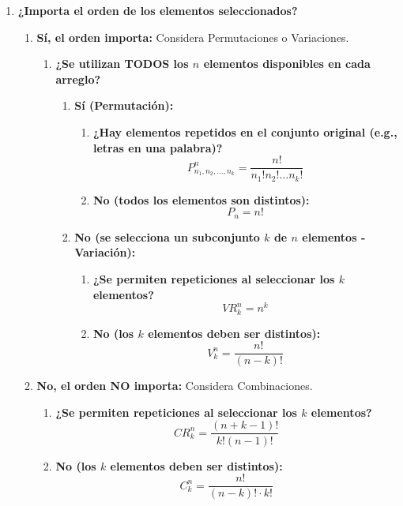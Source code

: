 \documentclass[12pt, letterpaper]{article}
\begin{document}
\begin{enumerate}[label=\bfseries Paso \arabic*:, wide, labelwidth=!, leftmargin=0pt]
    \item \textbf{¿Importa el orden de los elementos seleccionados?}
    \begin{enumerate}[label=\alph*)]
        \item \textbf{Sí, el orden importa:} Considera Permutaciones o Variaciones.
        \begin{enumerate}[label=\roman*)]
            \item \textbf{¿Se utilizan TODOS los $n$ elementos disponibles en cada arreglo?}
            \begin{enumerate}[label=\alph*)]
                \item \textbf{Sí (Permutación):}
                \begin{enumerate}[label=\roman*)]
                    \item \textbf{¿Hay elementos repetidos en el conjunto original (e.g., letras en una palabra)?}
                        \[ P_{n_1, n_2, \dots, n_k}^n = \frac{n!}{n_1! n_2! \dots n_k!} \]
                    \item \textbf{No (todos los elementos son distintos):}
                        \[ P_n = n! \]
                \end{enumerate}
                \item \textbf{No (se selecciona un subconjunto $k$ de $n$ elementos - Variación):}
                \begin{enumerate}[label=\roman*)]
                    \item \textbf{¿Se permiten repeticiones al seleccionar los $k$ elementos?}
                        \[ VR_k^n = n^k \]
                    \item \textbf{No (los $k$ elementos deben ser distintos):}
                        \[ V_k^n = \frac{n!}{(n - k)!} \]
                \end{enumerate}
            \end{enumerate}
        \end{enumerate}
        \item \textbf{No, el orden NO importa:} Considera Combinaciones.
        \begin{enumerate}[label=\roman*)]
            \item \textbf{¿Se permiten repeticiones al seleccionar los $k$ elementos?}
                \[ CR_k^n = \frac{(n+k-1)!}{k!(n-1)!} \]
            \item \textbf{No (los $k$ elementos deben ser distintos):}
                \[ C_k^n = \frac{n!}{(n - k)! \cdot k!} \]
        \end{enumerate}
    \end{enumerate}
\end{enumerate}
\end{document}
